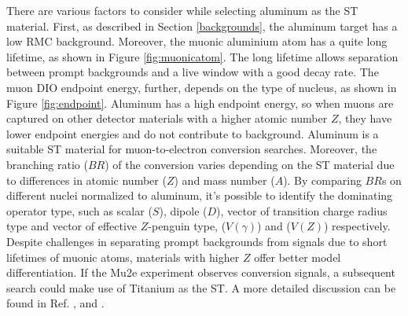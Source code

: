 There are various factors to consider while selecting aluminum as the ST material. 
First, as described in Section \ref{backgrounds}, the aluminum 
target has a low RMC background. Moreover, the muonic aluminium 
atom has a quite long lifetime, as shown in Figure \ref{fig:muonicatom}. 
The long lifetime allows separation between prompt backgrounds and a 
live window with a good decay rate. The muon DIO endpoint energy, 
further, depends on the type of nucleus, as shown in Figure \ref{fig:endpoint}. 
Aluminum has a high endpoint energy, so when muons are captured on other 
detector materials with a higher atomic number $Z$, they have lower 
endpoint energies and do not contribute to background. Aluminum is a 
suitable ST material for muon-to-electron conversion searches.
Moreover, the branching ratio ($BR$) of the conversion varies 
depending on the ST material due to differences in atomic number 
($Z$) and mass number ($A$). By comparing $BR$s on different nuclei 
normalized to aluminum, it's possible to identify the dominating 
operator type, such as scalar ($S$), dipole ($D$), vector of 
transition charge radius type and vector of effective $Z$-penguin type, 
($V(\gamma)$) and ($V(Z)$) respectively. 
Despite challenges in separating prompt backgrounds from 
signals due to short lifetimes of muonic atoms, 
materials with higher $Z$ offer better model differentiation. 
If the Mu2e experiment observes conversion signals, a subsequent search 
could make use of Titanium as the ST. A more detailed discussion can be 
found in Ref. \cite{PhysRevD.80.013002}, \cite{PhysRevD.76.059902} and 
\cite{abusalma2018expression}.


